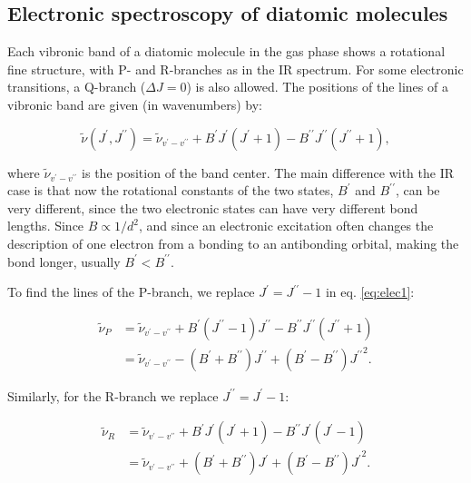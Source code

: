 \documentclass[
  english,
  9pt,
]{extbook}
\theoremstyle{definition}
\theoremstyle{definition}
\theoremstyle{definition}
\theoremstyle{definition}
\theoremstyle{remark}
\begin{document}
\subsection{Electronic spectroscopy of diatomic molecules}\label{electronic-spectroscopy-of-diatomic-molecules}

Each vibronic band of a diatomic molecule in the gas phase shows a rotational fine structure, with P- and R-branches as in the IR spectrum. For some electronic transitions, a Q-branch (\(\Delta J=0\)) is also allowed. The positions of the lines of a vibronic band are given (in wavenumbers) by:

\begin{equation}
\tilde{\nu}(J^{\prime },J^{{\prime \prime }})={\tilde  \nu }_{{v^{\prime }-v^{{\prime \prime }}}}+B^{\prime }J^{\prime }(J^{\prime }+1)-B^{{\prime \prime }}J^{{\prime \prime }}(J^{{\prime \prime }}+1),
\label{eq:elec1}
\end{equation}

where \({\tilde  \nu }_{{v^{\prime }-v^{{\prime \prime }}}}\) is the position of the band center. The main difference with the IR case is that now the rotational constants of the two states, \(B^{\prime}\) and \(B^{\prime\prime}\), can be very different, since the two electronic states can have very different bond lengths. Since \(B\propto 1/d^2\), and since an electronic excitation often changes the description of one electron from a bonding to an antibonding orbital, making the bond longer, usually \(B^{\prime}<B^{\prime\prime}\).

To find the lines of the P-branch, we replace \(J^{\prime }=J^{{\prime \prime}}-1\) in eq. \eqref{eq:elec1}:

\begin{equation}
\begin{aligned}
{\tilde  \nu }_{P}&={\tilde  \nu}_{{v^{\prime}-v^{\prime\prime}}}+B^{\prime}(J^{\prime\prime}-1)J^{\prime\prime}-B^{\prime\prime}J^{\prime\prime}(J^{\prime\prime}+1) \\
&={\tilde  \nu }_{{v^{\prime}-v^{\prime\prime}}}-(B^{\prime}+B^{\prime\prime})J^{\prime\prime}+(B^{\prime}-B^{\prime\prime}){J^{\prime\prime}}^{2}.
\end{aligned}
\label{eq:elec2}
\end{equation}

Similarly, for the R-branch we replace \(J^{\prime\prime }=J^{{\prime }}-1\):

\begin{equation}
\begin{aligned}
{\tilde  \nu }_{R} &={\tilde  \nu}_{{v^{\prime}-v^{\prime\prime}}}+B^{\prime}J^{\prime}(J^{\prime}+1)-B^{\prime\prime}J^{\prime}(J^{\prime}-1) \\
&={\tilde  \nu }_{{v^{\prime}-v^{\prime\prime}}}+(B^{\prime}+B^{\prime\prime})J^{\prime}+(B^{\prime}-B^{\prime\prime}){J^{\prime}}^{2}.
\end{aligned}
\label{eq:elec3}
\end{equation}
\end{document}

